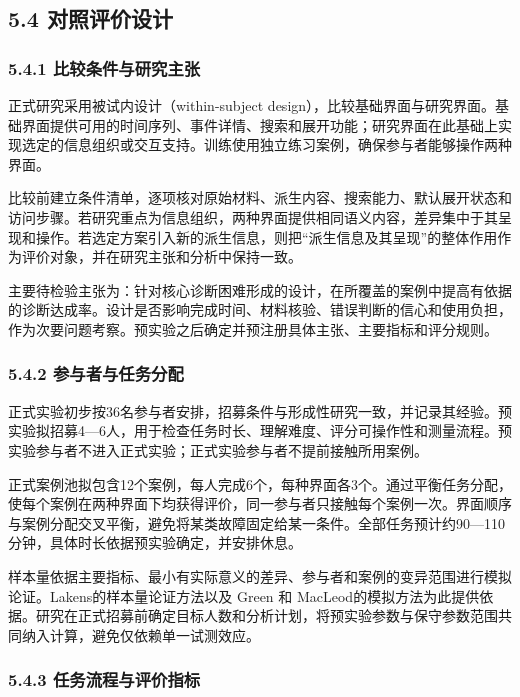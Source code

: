 \subsection{5.4 对照评价设计}

\subsubsection{5.4.1 比较条件与研究主张}

正式研究采用被试内设计（within-subject design），比较基础界面与研究界面。基础界面提供可用的时间序列、事件详情、搜索和展开功能；研究界面在此基础上实现选定的信息组织或交互支持。训练使用独立练习案例，确保参与者能够操作两种界面。

比较前建立条件清单，逐项核对原始材料、派生内容、搜索能力、默认展开状态和访问步骤。若研究重点为信息组织，两种界面提供相同语义内容，差异集中于其呈现和操作。若选定方案引入新的派生信息，则把“派生信息及其呈现”的整体作用作为评价对象，并在研究主张和分析中保持一致。

主要待检验主张为：针对核心诊断困难形成的设计，在所覆盖的案例中提高有依据的诊断达成率。设计是否影响完成时间、材料核验、错误判断的信心和使用负担，作为次要问题考察。预实验之后确定并预注册具体主张、主要指标和评分规则。

\subsubsection{5.4.2 参与者与任务分配}

正式实验初步按36名参与者安排，招募条件与形成性研究一致，并记录其经验。预实验拟招募4—6人，用于检查任务时长、理解难度、评分可操作性和测量流程。预实验参与者不进入正式实验；正式实验参与者不提前接触所用案例。

正式案例池拟包含12个案例，每人完成6个，每种界面各3个。通过平衡任务分配，使每个案例在两种界面下均获得评价，同一参与者只接触每个案例一次。界面顺序与案例分配交叉平衡，避免将某类故障固定给某一条件。全部任务预计约90—110分钟，具体时长依据预实验确定，并安排休息。

样本量依据主要指标、最小有实际意义的差异、参与者和案例的变异范围进行模拟论证。Lakens\cite{ref67}的样本量论证方法以及 Green 和 MacLeod\cite{ref68}的模拟方法为此提供依据。研究在正式招募前确定目标人数和分析计划，将预实验参数与保守参数范围共同纳入计算，避免仅依赖单一试测效应。

\subsubsection{5.4.3 任务流程与评价指标}

